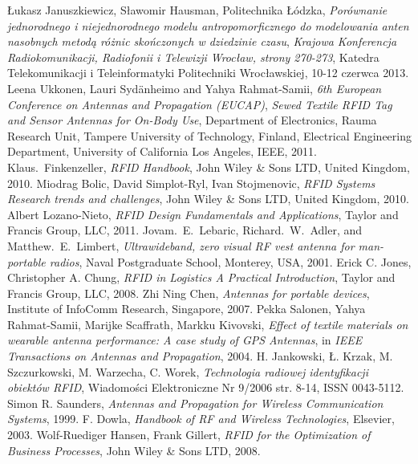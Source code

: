 \begin{thebibliography}{99}

%
Łukasz Januszkiewicz, Sławomir Hausman, Politechnika Łódzka, \emph{Porównanie jednorodnego i niejednorodnego modelu antropomorficznego do modelowania anten nasobnych metodą różnic skończonych w dziedzinie czasu}, \emph{Krajowa Konferencja Radiokomunikacji, Radiofonii i Telewizji Wrocław, strony 270-273}, Katedra Telekomunikacji i Teleinformatyki Politechniki Wrocławskiej, 10-12 czerwca 2013.
%
Leena Ukkonen, Lauri Syd\"anheimo and Yahya Rahmat-Samii, \emph{6th European Conference on Antennas and Propagation (EUCAP)}, \emph{Sewed Textile RFID Tag and Sensor Antennas for On-Body Use}, Department of Electronics, Rauma Research Unit, Tampere University of Technology, Finland, Electrical Engineering Department, University of California Los Angeles, IEEE, 2011.
%
Klaus.~Finkenzeller, \emph{RFID Handbook}, John Wiley \& Sons LTD, United Kingdom, 2010.
%
Miodrag Bolic, David Simplot-Ryl, Ivan Stojmenovic, \emph{RFID Systems Research trends and challenges}, John Wiley \& Sons LTD, United Kingdom, 2010.
%
Albert Lozano-Nieto, \emph{RFID Design Fundamentals and Applications}, Taylor and Francis Group, LLC, 2011.
%
Jovam.~E.~Lebaric, Richard.~W.~Adler, and Matthew.~E.~Limbert, \emph{Ultrawideband, zero visual RF vest antenna for man-portable radios}, Naval Postgraduate School, Monterey, USA, 2001. 
%
Erick C. Jones, Christopher A. Chung, \emph{RFID in Logistics A Practical Introduction}, Taylor and Francis Group, LLC, 2008. 
%
Zhi Ning Chen, \emph{Antennas for portable devices}, Institute of InfoComm Research, Singapore, 2007.
%
Pekka Salonen, Yahya Rahmat-Samii, Marijke Scaffrath, Markku Kivovski, \emph{Effect of textile materials on wearable antenna performance: A case study of GPS Antennas}, in \emph{IEEE Transactions on Antennas and Propagation}, 2004.
%
H. Jankowski, Ł. Krzak, M. Szczurkowski, M. Warzecha, C. Worek, \emph{Technologia radiowej identyfikacji obiektów RFID}, Wiadomości Elektroniczne Nr 9/2006 str. 8-14, ISSN 0043-5112.
%
Simon R. Saunders, \emph{Antennas and Propagation for Wireless Communication Systems}, 1999. 
%
F. Dowla, \emph{Handbook of RF and Wireless Technologies}, Elsevier, 2003.
%
Wolf-Ruediger Hansen, Frank Gillert, \emph{RFID for the Optimization of Business Processes}, John Wiley \& Sons LTD, 2008.

\end{thebibliography}
